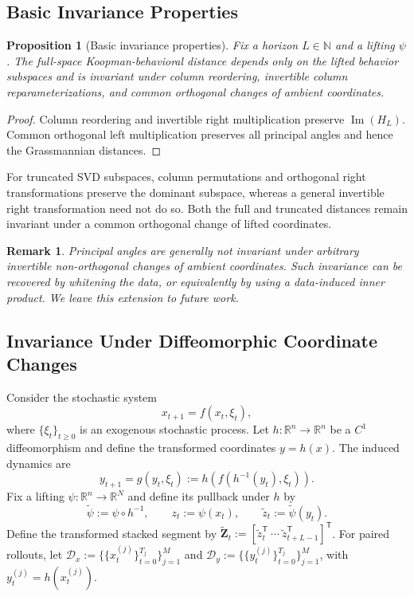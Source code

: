 \documentclass[letterpaper, 10 pt, conference]{ieeeconf}  %
\DeclareMathOperator*{\im}{Im}
\newtheorem{remark}{Remark}
\newtheorem{proposition}{Proposition}
\newcommand{\R}{\mathbb{R}}
\newcommand{\T}{^{\mathsf T}}
\begin{document}
\subsection{Basic Invariance Properties}
\label{sec:invariance}

\begin{proposition}[Basic invariance properties]
\label{prop:invariance_multirun}
Fix a horizon $L\in\mathbb N$ and a lifting $\psi$. The full-space Koopman-behavioral distance depends only on the lifted behavior subspaces and is invariant under column reordering, invertible column reparameterizations, and common orthogonal changes of ambient coordinates.
\end{proposition}
\begin{proof}
Column reordering and invertible right multiplication preserve $\im(H_L)$. Common orthogonal left multiplication preserves all principal angles and hence the Grassmannian distances.
\end{proof}
For truncated SVD subspaces, column permutations and orthogonal right transformations preserve the dominant subspace, whereas a general invertible right transformation need not do so. Both the full and truncated distances remain invariant under a common orthogonal change of lifted coordinates.

\begin{remark}
Principal angles are generally not invariant under arbitrary invertible non-orthogonal changes of ambient coordinates. Such invariance can be recovered by whitening the data, or equivalently by using a data-induced inner product. We leave this extension to future work.
\end{remark}



\subsection{Invariance Under Diffeomorphic Coordinate Changes}
\label{subsec:stoch_invariance}

Consider the stochastic system
\begin{equation}
  x_{t+1}=f(x_t,\xi_t),
  \label{eq:stoch_sys_x}
\end{equation}
where $\{\xi_t\}_{t\geq0}$ is an exogenous stochastic process. Let $h:\R^n\to\R^n$ be a $C^1$ diffeomorphism and define the transformed coordinates $y=h(x)$. The induced dynamics are
\begin{equation}
  y_{t+1}=g(y_t,\xi_t):=h\!\left(f(h^{-1}(y_t),\xi_t)\right).
  \label{eq:stoch_sys_y}
\end{equation}
Fix a lifting $\psi:\R^n\to\R^N$ and define its pullback under $h$ by
\begin{equation}
  \widetilde\psi:=\psi\circ h^{-1},\qquad
  z_t:=\psi(x_t),\qquad
  \widetilde z_t:=\widetilde\psi(y_t).
  \label{eq:pullback_lift}
\end{equation}
Define the transformed stacked segment by $\widetilde{\mathbf Z}_t:=[\widetilde z_t\T\ \cdots\ \widetilde z_{t+L-1}\T]\T$. For paired rollouts, let $\mathcal D_x:=\{\{x_t^{(j)}\}_{t=0}^{T_j}\}_{j=1}^M$ and $\mathcal D_y:=\{\{y_t^{(j)}\}_{t=0}^{T_j}\}_{j=1}^M$, with $y_t^{(j)}=h(x_t^{(j)})$.
\end{document}
